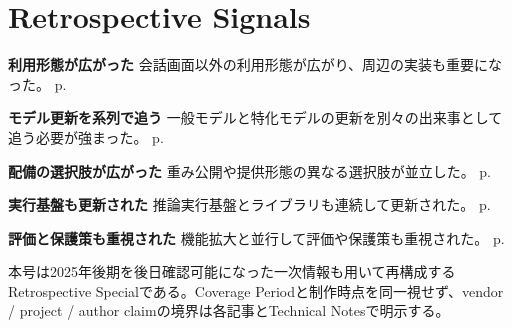\section*{Retrospective Signals}
\smallskip
\noindent\textbf{利用形態が広がった} 会話画面以外の利用形態が広がり、周辺の実装も重要になった。 \hfill{\footnotesize p.~\pageref{pkg:agent}}\par
\smallskip
\noindent\textbf{モデル更新を系列で追う} 一般モデルと特化モデルの更新を別々の出来事として追う必要が強まった。 \hfill{\footnotesize p.~\pageref{pkg:model}}\par
\smallskip
\noindent\textbf{配備の選択肢が広がった} 重み公開や提供形態の異なる選択肢が並立した。 \hfill{\footnotesize p.~\pageref{pkg:open}}\par
\smallskip
\noindent\textbf{実行基盤も更新された} 推論実行基盤とライブラリも連続して更新された。 \hfill{\footnotesize p.~\pageref{pkg:runtime}}\par
\smallskip
\noindent\textbf{評価と保護策も重視された} 機能拡大と並行して評価や保護策も重視された。 \hfill{\footnotesize p.~\pageref{pkg:control}}\par
\medskip
\begin{claimboundary}
本号は2025年後期を後日確認可能になった一次情報も用いて再構成するRetrospective Specialである。Coverage Periodと制作時点を同一視せず、vendor / project / author claimの境界は各記事とTechnical Notesで明示する。
\end{claimboundary}
\medskip
\tableofcontents
